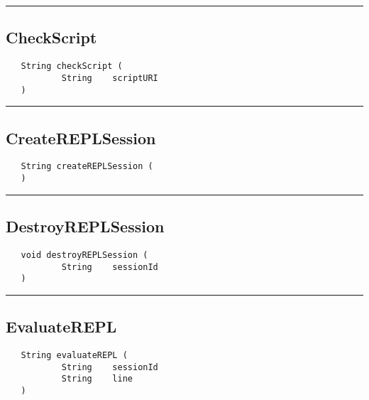 \rule{15cm}{2pt}
\subsection{CheckScript}
\label{Api:CheckScript}
\begin{verbatim}
   String checkScript (
           String    scriptURI
   )
\end{verbatim}



\rule{15cm}{2pt}
\subsection{CreateREPLSession}
\label{Api:CreateREPLSession}
\begin{verbatim}
   String createREPLSession (
   )
\end{verbatim}



\rule{15cm}{2pt}
\subsection{DestroyREPLSession}
\label{Api:DestroyREPLSession}
\begin{verbatim}
   void destroyREPLSession (
           String    sessionId
   )
\end{verbatim}



\rule{15cm}{2pt}
\subsection{EvaluateREPL}
\label{Api:EvaluateREPL}
\begin{verbatim}
   String evaluateREPL (
           String    sessionId
           String    line
   )
\end{verbatim}



